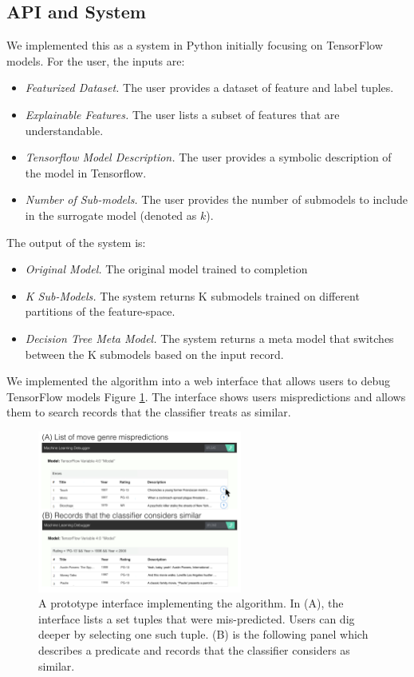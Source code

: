 \subsection{API and System}
We implemented this as a system in Python initially focusing on TensorFlow models.
For the user, the inputs are:
\begin{itemize}
\item \emph{Featurized Dataset. } The user provides a dataset of feature and label tuples.

\item \emph{Explainable Features. } The user lists a subset of features that are understandable.

\item \emph{Tensorflow Model Description. } The user provides a symbolic description of the model in Tensorflow.

\item \emph{Number of Sub-models. } The user provides the number of submodels to include in the surrogate model (denoted as $k$).
\end{itemize}

The output of the system is:
\begin{itemize}
\item \emph{Original Model. } The original model trained to completion

\item \emph{K Sub-Models. } The system returns K submodels trained on different partitions of the feature-space.

\item \emph{Decision Tree Meta Model. } The system returns a meta model that switches between the K submodels based on the input record.
\end{itemize}

We implemented the algorithm into a web interface that allows users to debug TensorFlow models Figure \ref{fig:interface}. The interface shows users mispredictions and allows them to search records that the classifier treats as similar.

\begin{figure}[t]
    \centering
    \includegraphics[width=0.6\textwidth]{figures/interface.png}
    \caption{A prototype interface implementing the algorithm. In (A), the interface lists a set tuples that were mis-predicted. Users can dig deeper by selecting one such tuple. (B) is the following panel which describes a predicate and records that the classifier considers as similar.}
    \label{fig:interface}
\end{figure}